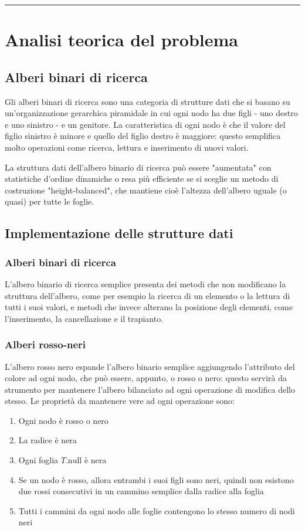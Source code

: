 \documentclass[a4paper,12pt]{article}
\begin{document}
    \par\noindent\rule{\textwidth}{0.2pt}
    \section{Analisi teorica del problema}

    \subsection{Alberi binari di ricerca}
    Gli alberi binari di ricerca sono una categoria di strutture dati che si basano su un'organizzazione gerarchica
    piramidale in cui ogni nodo ha due figli - uno destro e uno sinistro - e un genitore. La caratteristica di ogni
    nodo è che il valore del figlio sinistro è minore e quello del figlio destro è maggiore: questo semplifica molto
    operazioni come ricerca, lettura e inserimento di nuovi valori.

    La struttura dati dell'albero binario di ricerca può essere "aumentata" con statistiche d'ordine dinamiche o resa
    più efficiente se si sceglie un metodo di costruzione "height-balanced", che mantiene cioè l'altezza dell'albero
    uguale (o quasi) per tutte le foglie.
    \subsection{Implementazione delle strutture dati}

    \subsubsection{Alberi binari di ricerca}
    L'albero binario di ricerca semplice presenta dei metodi che non modificano la struttura dell'albero, come per
    esempio la ricerca di un elemento o la lettura di tutti i suoi valori, e metodi che invece alterano la posizione
    degli elementi, come l'inserimento, la cancellazione e il trapianto.

    \subsubsection{Alberi rosso-neri}
    L'albero rosso nero espande l'albero binario semplice aggiungendo l'attributo del colore ad ogni nodo, che può
    essere, appunto, o rosso o nero: questo servirà da strumento per mantenere l'albero bilanciato ad ogni operazione
    di modifica dello stesso.
    Le proprietà da mantenere vere ad ogni operazione sono:
    \begin{enumerate}
        \item Ogni nodo è rosso o nero
        \item La radice è nera
        \item Ogni foglia $T.\text{null}$ è nera
        \item Se un nodo è rosso, allora entrambi i suoi figli sono neri, quindi non esistono due rossi consecutivi in
        un cammino semplice dalla radice alla foglia
        \item Tutti i cammini da ogni nodo alle foglie contengono lo stesso numero di nodi neri
    \end{enumerate}
\end{document}
